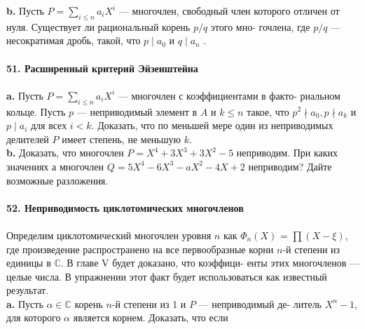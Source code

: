 \noindent\hspace*{10pt}\textbf{b.} Пусть $P=\sum_{i\leq n}a_iX^i$ — многочлен, свободный член которого\linebreak
отличен от нуля. Существует ли рациональный корень $p/q$ этого мно-\linebreak
гочлена, где $p/q$ — несократимая дробь, такой, что $p\;|\; a_0$ и $q \;|\; a_n$ .
\\
\\
\noindent\textbf{51. Расширенный критерий Эйзенштейна}\\\\
\hspace*{10pt}\textbf{a.} Пусть  $P=\sum_{i\leq n}a_iX^i$ — многочлен с коэффициентами в факто-\linebreak
риальном кольце. Пусть $p$ — неприводимый элемент в $A$ и $k\leq n$ такое,\linebreak
что  $p^2 \nmid a_0, p \nmid a_k$ и $p \;| \;a_i$ для всех $i < k$. Доказать, что по меньшей мере\linebreak
один из неприводимых делителей $P$ имеет степень, не меньшую $k$.\\
\hspace*{10pt}\textbf{b.} Доказать, что многочлен $P=X^4+3X^3+3X^2-5$ неприводим.\linebreak
При каких значениях а многочлен $Q=5X^4-6X^3-aX^2-4X+2$\linebreak
неприводим? Дайте возможные разложения.
\\
\\
\noindent\textbf{52. Неприводимость циклотомических многочленов}\\\\
\hspace*{10pt} Определим циклотомический многочлен уровня $n$ как $\Phi_n(X)$ =\linebreak
$\prod (X-\xi)$, где произведение распространено на все первообразные корни\linebreak
$n$-й степени из единицы в $\mathbb{C}$. В главе V будет доказано, что коэффици-\linebreak
енты этих многочленов — целые числа. В упражнении этот факт будет\linebreak
использоваться как известный результат.\\
\hspace*{10pt}\textbf{a.} Пусть $\alpha\in \mathbb{C}$ корень $n$-й степени из 1 и $P$ — неприводимый де-\linebreak
литель $X^n -1$, для которого $\alpha$ является корнем. Доказать, что если\linebreak
